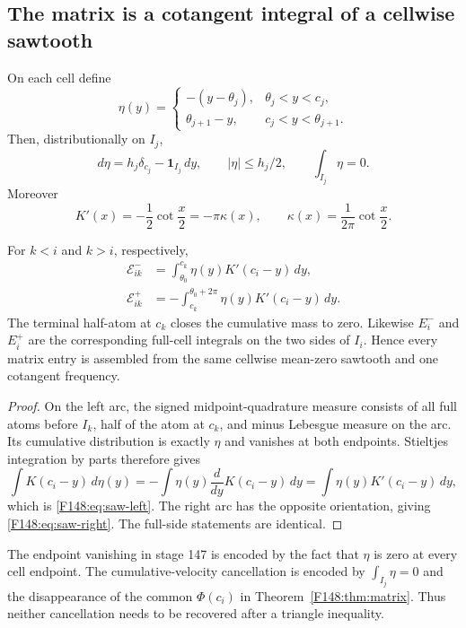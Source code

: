 \subsection{The matrix is a cotangent integral of a cellwise sawtooth}

On each cell define
\begin{equation}\label{F148:eq:eta}
 \eta(y)=\begin{cases}
 -(y-\theta_j),&\theta_j<y<c_j,\\
 \theta_{j+1}-y,&c_j<y<\theta_{j+1}.
 \end{cases}
\end{equation}
Then, distributionally on $I_j$,
\begin{equation}\label{F148:eq:eta-properties}
 d\eta=h_j\delta_{c_j}-\mathbf1_{I_j}\,dy,\qquad
 |\eta|\le h_j/2,\qquad
 \int_{I_j}\eta=0.
\end{equation}
Moreover
\begin{equation}\label{F148:eq:Kprime}
 K'(x)=-\frac12\cot\frac x2=-\pi\kappa(x),
 \qquad \kappa(x)=\frac1{2\pi}\cot\frac x2.
\end{equation}

\begin{proposition}
\label{F148:prop:sawtooth}
For $k<i$ and $k>i$, respectively,
\begin{align}
 \mathscr E_{ik}^-&=
 \int_{\theta_0}^{c_k}\eta(y)K'(c_i-y)\,dy,
 \label{F148:eq:saw-left}\\
 \mathscr E_{ik}^+&=-
 \int_{c_k}^{\theta_0+2\pi}\eta(y)K'(c_i-y)\,dy.
 \label{F148:eq:saw-right}
\end{align}
The terminal half-atom at $c_k$ closes the cumulative mass to zero.
Likewise $E_i^-$ and $E_i^+$ are the corresponding full-cell integrals
on the two sides of $I_i$.  Hence every matrix entry is assembled from
the same cellwise mean-zero sawtooth and one cotangent frequency.
\end{proposition}

\begin{proof}
On the left arc, the signed midpoint-quadrature measure consists of all
full atoms before $I_k$, half of the atom at $c_k$, and minus Lebesgue
measure on the arc.  Its cumulative distribution is exactly $\eta$ and
vanishes at both endpoints.  Stieltjes integration by parts therefore
gives
\begin{equation*}
 \int K(c_i-y)\,d\eta(y)
 =-\int\eta(y)\frac d{dy}K(c_i-y)\,dy
 =\int\eta(y)K'(c_i-y)\,dy,
\end{equation*}
which is \eqref{F148:eq:saw-left}.  The right arc has the opposite orientation,
giving \eqref{F148:eq:saw-right}.  The full-side statements are identical.
\end{proof}

\begin{remark}
The endpoint vanishing in stage 147 is encoded by the fact that $\eta$
is zero at every cell endpoint.  The cumulative-velocity cancellation is
encoded by $\int_{I_j}\eta=0$ and the disappearance of the common
$\Phi(c_i)$ in Theorem~\ref{F148:thm:matrix}.  Thus neither cancellation needs
to be recovered after a triangle inequality.
\end{remark}
\endgroup
